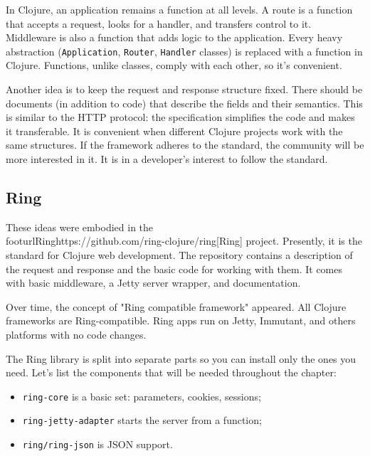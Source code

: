 \label{http-all-function}

In Clojure, an application remains a function at all levels. A route is a function that accepts a request, looks for a handler, and transfers control to it. Middleware 
is also a function that adds logic to the application. Every heavy abstraction (\verb|Application|, \verb|Router|, \verb|Handler| classes) is replaced with a function in Clojure. Functions, unlike classes, comply with each other, so it's convenient.

Another idea is to keep the request and response structure fixed. There should be documents (in addition to code) that describe the fields and their semantics. This is similar to the HTTP protocol: the specification simplifies the code and makes it transferable. It is convenient when different Clojure projects work with the same structures. If the framework adheres to the standard, the community will be more interested in it. It is in a developer's interest to follow the standard.

\subsection{Ring}

\label{ring-jetty}

These ideas were embodied in the \\footurl{Ring}{https://github.com/ring-clojure/ring}[Ring] project.
Presently, it is the standard for Clojure web development. The repository contains a description of the request and response and the basic code for working with them. It comes with basic middleware, a Jetty server wrapper, and documentation.


Over time, the concept of "Ring compatible framework" appeared. All Clojure frameworks are Ring-compatible. Ring apps run on Jetty, Immutant, and others platforms with no code changes.

The Ring library is split into separate parts so you can install only the ones you need. Let's list the components that will be needed throughout the chapter:

\begin{itemize}

\item
\verb|ring-core| is a basic set: parameters, cookies, sessions;

\item
\verb|ring-jetty-adapter| starts the server from a function;

\item
\verb|ring/ring-json| is JSON support.

\end{itemize}

